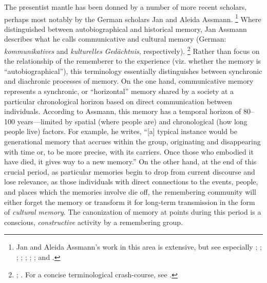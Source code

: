 The presentist mantle has been donned by a number of more recent scholars, perhaps most notably by the German scholars Jan and Aleida Assmann.%
    \footnote{%
        Jan and Aleida Assmann's work in this area is extensive, but see especially 
        \cite{a_assmann_poltermann1995}; 
        \cite{a_assmann2011};
        \cite{assmann_nikulin2015}; 
        \cite{assmann2014};
        \cite{assmann2011};
        \cite{assmann_erllnunning2008};
        \cite{assmann2006}; and
        \cite{assmannassmann_merten-etal1994}.}
Where \halbwachs distinguished between autobiographical and historical memory, Jan Assmann describes what he calls communicative and cultural memory (German: \emph{kommunikatives} and \emph{kulturelles} \emph{Gedächtnis}, respectively).%
    \footnote{%
        \Cite[36]{assmann2011};
        \cite{assmann_erllnunning2008}.
        For a concise terminological crash-course, see
        \cite[182--183]{hubenthal_carstens-hasselbalch2012}.}
Rather than focus on the relationship of the rememberer to the experience (viz. whether the memory is ``autobiographical''), this terminology essentially distinguishes between synchronic and diachronic processes of memory. On the one hand, communicative memory represents a synchronic, or ``horizontal'' memory shared by a society at a particular chronological horizon based on direct communication between individuals. According to Assmann, this memory has a temporal horizon of 80--100 years---limited by spatial (where people are) and chronological (how long people live) factors. For example, he writes, ``[a] typical instance would be generational memory that accrues within the group, originating and disappearing with time or, to be more precise, with its carriers. Once those who embodied it have died, it gives way to a new memory.''%
        \autocite[36]{assmann2011}
On the other hand, at the end of this crucial period, as particular memories begin to drop from current discourse and lose relevance, as those individuals with direct connections to the events, people, and places which the memories involve die off, the remembering community will either forget the memory or transform it for long-term transmission in the form of \emph{cultural memory}. The canonization of memory at points during this period is a conscious, \emph{constructive} activity by a remembering group.%
    \autocite[45]{assmann2011}  

